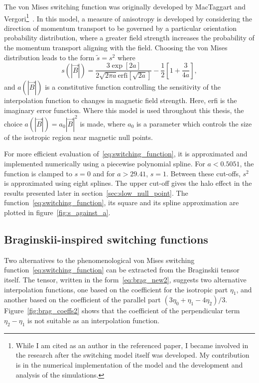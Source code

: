 The von Mises switching function was originally developed by MacTaggart and Vergori\footnote{While I am cited as an author in the referenced paper, I became involved in the research after the switching model itself was developed. My contribution is in the numerical implementation of the model and the development and analysis of the simulations.}~\cite{mactaggartBraginskiiMagnetohydrodynamicsArbitrary2017}. In this model, a measure of anisotropy is developed by considering the direction of momentum transport to be governed by a particular orientation probability distribution, where a greater field strength increases the probability of the momentum transport aligning with the field. Choosing the von Mises distribution leads to the form $\tilde{s} = s^2$ where
\begin{equation}
  \label{eq:switching_function}
s(|\vec{B}|) = \frac{3 \exp[2a]}{2\sqrt{2\pi a} \text{erfi}[\sqrt{2a}]} - \frac{1}{2}\left[ 1 + \frac{3}{4a} \right],
\end{equation}
and $a(|\vec{B}|)$ is a constitutive function controlling the sensitivity of the interpolation function to changes in magnetic field strength. Here, erfi is the imaginary error function. Where this model is used throughout this thesis, the choice $a(|\vec{B}|) = a_0 |\vec{B}|^2$ is made, where $a_0$ is a parameter which controls the size of the isotropic region near magnetic null points. 

For more efficient evaluation of~\eqref{eq:switching_function}, it is approximated and implemented numerically using a piecewise polynomial spline. For $a < 0.5051$, the function is clamped to $s=0$ and for $a > 29.41$, $s=1$. Between these cut-offs, $s^2$ is approximated using eight splines. The upper cut-off gives the halo effect in the results presented later in section~\ref{sec:slow_null_point}. The function~\eqref{eq:switching_function}, its square and its spline approximation are plotted in figure~\ref{fig:s_against_a}. 

\subsection{Braginskii-inspired switching functions}

Two alternatives to the phenomenological von Mises switching function~\eqref{eq:switching_function} can be extracted from the Braginskii tensor itself. The tensor, written in the form~\eqref{eq:brag_new2}, suggests two alternative interpolation functions, one based on the coefficient for the isotropic part $\eta_1$, and another based on the coefficient of the parallel part $(3\eta_0+\eta_1-4\eta_2)/3$. Figure~\ref{fig:brag_coeffs2} shows that the coefficient of the perpendicular term $\eta_2 - \eta_1$ is not suitable as an interpolation function.

